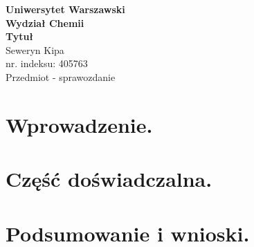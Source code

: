 \documentclass{sewClass}
\begin{document}
	
	\begin{titlepage}
		
		\begin{center}
			
			\Huge \textbf{Uniwersytet Warszawski \\ Wydział Chemii} \\[3cm]
			\Huge \textbf{Tytuł}
			\\[3cm]
			\Large  Seweryn Kipa \\ nr. indeksu: 405763
			\\[11.5cm]
			\Large Przedmiot - sprawozdanie
			
		\end{center}
		
	\end{titlepage}
	
	\section{Wprowadzenie.}
	\section {Część doświadczalna.}
	\section{Podsumowanie i wnioski.}
		
\end{document}
